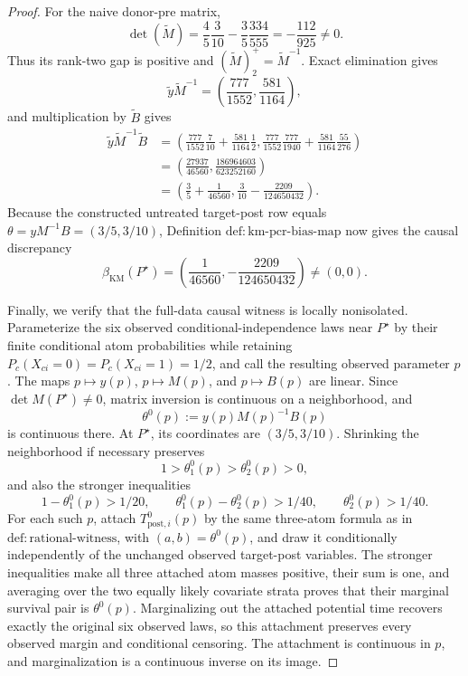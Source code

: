 \documentclass{article}
\begin{document}
\begin{proof}
For the naive donor-pre matrix,
\[
\det(\widetilde M)
=\frac45\frac3{10}-\frac35\frac{334}{555}
=-\frac{112}{925}\ne0.
\]
Thus its rank-two gap is positive and \((\widetilde M)_2^+=\widetilde M^{-1}\). Exact elimination gives
\[
\widetilde y\widetilde M^{-1}
=\left(\frac{777}{1552},\frac{581}{1164}\right),
\]
and multiplication by \(\widetilde B\) gives
\[
\begin{aligned}
\widetilde y\widetilde M^{-1}\widetilde B
&=\left(
\frac{777}{1552}\frac7{10}+\frac{581}{1164}\frac12,
\frac{777}{1552}\frac{777}{1940}
 +\frac{581}{1164}\frac{55}{276}
\right)\\
&=\left(\frac{27937}{46560},
\frac{186964603}{623252160}\right)\\
&=\left(\frac35+\frac1{46560},
\frac3{10}-\frac{2209}{124650432}\right).
\end{aligned}
\]
Because the constructed untreated target-post row equals \(\theta=yM^{-1}B=(3/5,3/10)\), Definition \(\mathrm{def{:}km\mbox{-}pcr\mbox{-}bias\mbox{-}map}\) now gives the causal discrepancy
\[
\beta_{\mathrm{KM}}(P^\star)
=\left(\frac1{46560},-\frac{2209}{124650432}\right)\ne(0,0).
\]

Finally, we verify that the full-data causal witness is locally nonisolated. Parameterize the six observed conditional-independence laws near \(P^\star\) by their finite conditional atom probabilities while retaining \(P_c(X_{ci}=0)=P_c(X_{ci}=1)=1/2\), and call the resulting observed parameter \(p\). The maps \(p\mapsto y(p)\), \(p\mapsto M(p)\), and \(p\mapsto B(p)\) are linear. Since \(\det M(P^\star)\ne0\), matrix inversion is continuous on a neighborhood, and
\[
\theta^0(p):=y(p)M(p)^{-1}B(p)
\]
is continuous there. At \(P^\star\), its coordinates are \((3/5,3/10)\). Shrinking the neighborhood if necessary preserves
\[
1>\theta^0_1(p)>\theta^0_2(p)>0,
\]
and also the stronger inequalities
\[
1-\theta^0_1(p)>1/20,
\qquad
\theta^0_1(p)-\theta^0_2(p)>1/40,
\qquad
\theta^0_2(p)>1/40.
\]
For each such \(p\), attach \(T^{0}_{\mathrm{post},i}(p)\) by the same three-atom formula as in \(\mathrm{def{:}rational\mbox{-}witness}\), with \((a,b)=\theta^0(p)\), and draw it conditionally independently of the unchanged observed target-post variables. The stronger inequalities make all three attached atom masses positive, their sum is one, and averaging over the two equally likely covariate strata proves that their marginal survival pair is \(\theta^0(p)\). Marginalizing out the attached potential time recovers exactly the original six observed laws, so this attachment preserves every observed margin and conditional censoring. The attachment is continuous in \(p\), and marginalization is a continuous inverse on its image.


\end{proof}
\end{document}
